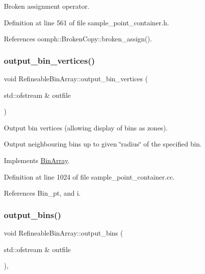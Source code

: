 Broken assignment operator. 



Definition at line 561 of file sample\+\_\+point\+\_\+container.\+h.



References oomph\+::\+Broken\+Copy\+::broken\+\_\+assign().

\mbox{\label{classRefineableBinArray_a982851086eb3973d4f17d5a5364d8faa}} 
\subsubsection{\texorpdfstring{output\+\_\+bin\+\_\+vertices()}{output\_bin\_vertices()}}
{\footnotesize\ttfamily void Refineable\+Bin\+Array\+::output\+\_\+bin\+\_\+vertices (\begin{DoxyParamCaption}\item[{std\+::ofstream \&}]{outfile }\end{DoxyParamCaption})\hspace{0.3cm}{\ttfamily [virtual]}}



Output bin vertices (allowing display of bins as zones). 

Output neighbouring bins up to given \char`\"{}radius\char`\"{} of the specified bin. 

Implements \hyperlink{classBinArray_afc595a05f2ab19e1bb973c5a076b1432}{Bin\+Array}.



Definition at line 1024 of file sample\+\_\+point\+\_\+container.\+cc.



References Bin\+\_\+pt, and i.

\mbox{\label{classRefineableBinArray_ab92ef5225b96b684b58f3a0905aacf75}} 
\subsubsection{\texorpdfstring{output\+\_\+bins()}{output\_bins()}}
{\footnotesize\ttfamily void Refineable\+Bin\+Array\+::output\+\_\+bins (\begin{DoxyParamCaption}\item[{std\+::ofstream \&}]{outfile }\end{DoxyParamCaption})\hspace{0.3cm}{\ttfamily [inline]}, {\ttfamily [virtual]}}



